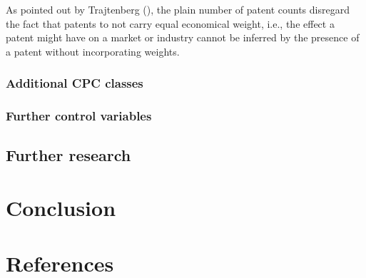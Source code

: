 \documentclass[
  11,
  a4paperpaper,
]{article}
\let\oldsection\section
\renewcommand\section{\clearpage\oldsection}
\begin{document}
As pointed out by Trajtenberg
(), the plain number of
patent counts disregard the fact that patents to not carry equal
economical weight, i.e., the effect a patent might have on a market or
industry cannot be inferred by the presence of a patent without
incorporating weights.

\subsubsection{Additional CPC classes}\label{additional-cpc-classes}

\subsubsection{Further control
variables}\label{further-control-variables}

\subsection{Further research}\label{further-research}

\section{Conclusion}\label{conclusion}

\newpage{}

\section*{References}\label{sec-references}
\end{document}
